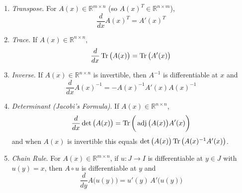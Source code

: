 \begin{theorem}
\begin{enumerate}
			\item \textit{Transpose}. For $A(x) \in \mathbb{R}^{m \times n}$ (so $A(x)^T \in \mathbb{R}^{n \times m}$),
				\begin{equation}
					\frac{d}{dx} A(x)^T = A'(x)^T
				\end{equation}
			\item \textit{Trace}. If $A(x) \in \mathbb{R}^{n \times n}$,
				\begin{equation}
					\frac{d}{dx} \operatorname{Tr}\big(A(x)\big) = \operatorname{Tr} \big( A'(x) \big)
				\end{equation}
			\item \textit{Inverse}. If $A(x) \in \mathbb{R}^{n \times n}$ is invertible, then $A^{-1}$ is differentiable at $x$ and
				\begin{equation}
					\frac{d}{dx} A(x)^{-1} = -A(x)^{-1} A'(x) A(x)^{-1}
				\end{equation}
			\item \textit{Determinant (Jacobi's Formula)}. If $A(x) \in \mathbb{R}^{n \times n}$,
				\begin{equation}
					\frac{d}{dx} \det\big(A(x)\big) = \operatorname{Tr} \bigg( \operatorname{adj}\big(A(x)\big) A'(x) \bigg)
				\end{equation}
				and when $A(x)$ is invertible this equals $\det\big(A(x)\big) \operatorname{Tr} \big( A(x)^{-1} A'(x) \big)$.
			\item \textit{Chain Rule}. For $A(x) \in \mathbb{R}^{m \times n}$, if $u: J \to I$ is differentiable at $y \in J$ with $u(y) = x$, then $A \circ u$ is differentiable at $y$ and
				\begin{equation}
					\frac{d}{dy} A\big(u(y)\big) = u'(y) \, A'\big(u(y)\big)
				\end{equation}
		\end{enumerate}
	\end{theorem}
